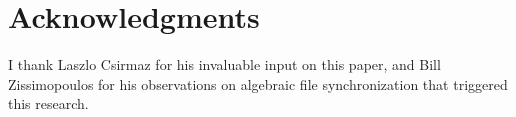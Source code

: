 \documentclass[12pt]{article}
\begin{document}














\section{Acknowledgments}

I thank Laszlo Csirmaz for his invaluable input on this paper,
and Bill Zissimopoulos for his observations on algebraic file synchronization that triggered this research.

\begin{thebibliography}{99}



\end{thebibliography}
\end{document}
